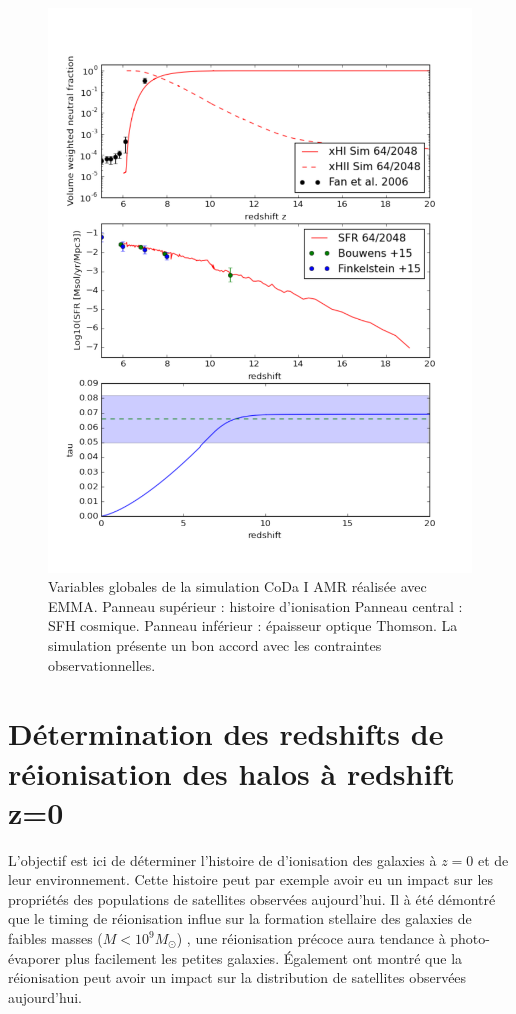 \begin{figure}
        \includegraphics[width=.95\linewidth]{img/05/x_sfr_tau.pdf} 
        \caption[Contraintes CoDa I AMR]{ Variables globales de la simulation \ac{CoDa} I \ac{AMR} réalisée avec EMMA.
        Panneau supérieur : histoire d'ionisation
		Panneau central : SFH cosmique.
        Panneau inférieur : épaisseur optique Thomson.
        La simulation présente un bon accord avec les contraintes observationnelles.
		\label{fig:presCODAEMMA}}
\end{figure}


\section{Détermination des redshifts de réionisation des halos à redshift z=0}

L'objectif est ici de déterminer l'histoire de d'ionisation des galaxies à $z=0$ et de leur environnement.
Cette histoire peut par exemple avoir eu un impact sur les propriétés des populations de satellites observées aujourd'hui.
Il à été démontré que le timing de réionisation influe sur la formation stellaire des galaxies de faibles masses ($M<10^9M_\odot$) \citep{ocvirk_reionization_2014}, une réionisation précoce aura tendance à photo-évaporer plus facilement les petites galaxies.
Également \citep{2015ApJ...800...34G} ont montré que la réionisation peut avoir un impact sur la distribution de satellites observées aujourd'hui.


